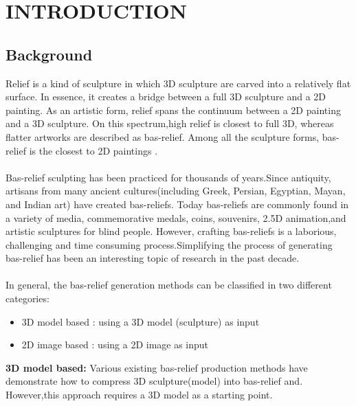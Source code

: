 \chapter{INTRODUCTION}

\section{Background}

Relief is a kind of sculpture in which 3D sculpture are carved into a relatively flat surface. In essence, it creates a bridge between a full 3D sculpture and a 2D painting. As an artistic form, relief spans the continuum between a 2D painting and a 3D sculpture\cite{weyrich2007digital}. On this spectrum,high relief is closest to full 3D, whereas flatter artworks are described as bas-relief. Among all the sculpture forms, bas-relief is the closest to 2D paintings\cite{kerber2009feature} \cite{barron2012color}.\\ \\
Bas-relief sculpting has been practiced for thousands of years.Since antiquity, artisans from many ancient cultures(including Greek, Persian, Egyptian, Mayan, and Indian art) have created bas-reliefs.
Today bas-reliefs are commonly found in a variety of media, commemorative medals, coins, souvenirs, 2.5D animation,and artistic sculptures for blind people. However, crafting bas-reliefs is a laborious, challenging and time consuming process.Simplifying the process of generating bas-relief has been an interesting topic of research in the past decade\cite{kerber2012computer}. \\ \\ 
In general, the bas-relief generation methods can be classified in two different categories:
\begin{itemize}
 \item 3D model based : using a 3D model (sculpture) as input 
 \item 2D image based : using a 2D image as input
\end{itemize} 

\textbf{3D model based:} Various existing bas-relief production methods have demonstrate how to compress 3D sculpture(model) into bas-relief \cite{weyrich2007digital}and\cite{kerber2009feature}. However,this approach requires a 3D model as a starting point. 



